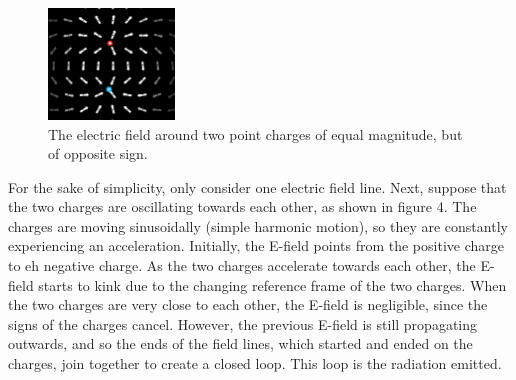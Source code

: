 \documentclass[12pt]{article}
\begin{document}
\begin{figure}[h]
    \centering
    \includegraphics[width=0.3\textwidth]{positive-negative-EField.png}
    \caption{The electric field around two point charges of equal magnitude, but of opposite sign.}
\end{figure} 

For the sake of simplicity, only consider one electric field line. Next, suppose that the two charges are oscillating towards each other, as shown in figure 4. The charges are moving sinusoidally (simple harmonic motion), so they are constantly experiencing an acceleration. Initially, the E-field points from the positive charge to eh negative charge. As the two charges accelerate towards each other, the E-field starts to kink due to the changing reference frame of the two charges. When the two charges are very close to each other, the E-field is negligible, since the signs of the charges cancel. However, the previous E-field is still propagating outwards, and so the ends of the field lines, which started and ended on the charges, join together to create a closed loop. This loop is the radiation emitted.
\end{document}
